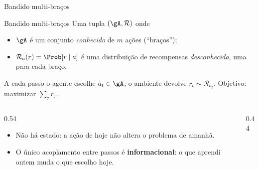 \documentclass[aspectratio=169, 10pt]{beamer}
\begin{document}
\begin{frame}{Bandido multi-braços}
  \begin{defbox}{Bandido multi-braços}
    Uma tupla $(\gA, \mathcal{R})$ onde
    \begin{itemize}\setlength{\itemsep}{0.2ex}
      \item $\gA$ é um conjunto \emph{conhecido} de $m$ ações (``braços'');
      \item $\mathcal{R}_a(r) = \Prob[r \mid a]$ é uma distribuição de
            recompensas \emph{desconhecida}, uma para cada braço.
    \end{itemize}
    A cada passo o agente escolhe $a_t \in \gA$; o ambiente devolve
    $r_t \sim \mathcal{R}_{a_t}$. Objetivo: maximizar $\sum_{\tau} r_\tau$.
  \end{defbox}

  \begin{columns}[T]
    \begin{column}{0.54\textwidth}
      \begin{itemize}\small
        \item Não há estado: a ação de hoje não altera o problema de amanhã.
        \item O único acoplamento entre passos é \textbf{informacional}:
              o que aprendi ontem muda o que escolho hoje.
      \end{itemize}
    \end{column}
    \begin{column}{0.44\textwidth}
      \centering
    \end{column}
  \end{columns}
\end{frame}
\end{document}
